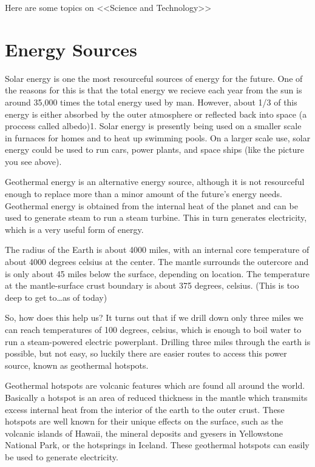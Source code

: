 \documentclass[a4paper]{article}
\begin{document}
Here are some topics on <<Science and Technology>>

\section{Energy Sources}

Solar energy is one the most resourceful sources of energy for the future. One of the reasons
for this is that the total energy we recieve each year from the sun is around 35,000 times
the total energy used by man. However, about 1/3 of this energy is either absorbed by the
outer atmosphere or reflected back into space (a proccess called albedo)1.
Solar energy is presently being used on a smaller scale in furnaces for homes and to heat up
swimming pools. On a larger scale use, solar energy could be used to run cars, power plants,
and space ships (like the picture you see above).

Geothermal energy is an alternative energy source, although it is not resourceful enough to
replace more than a minor amount of the future's energy needs. Geothermal energy is obtained
from the internal heat of the planet and can be used to generate steam to run a steam turbine.
This in turn generates electricity, which is a very useful form of energy.

The radius of the Earth is about 4000 miles, with an internal core temperature of about 4000
degrees celsius at the center. The mantle surrounds the outercore and is only about 45 miles
below the surface, depending on location. The temperature at the mantle-surface crust boundary is
about 375 degrees, celsius. (This is too deep to get to\dots as of today)

So, how does this help us? It turns out that if we drill down only three miles we can reach
temperatures of 100 degrees, celsius, which is enough to boil water to run a steam-powered electric
powerplant. Drilling three miles through the earth is possible, but not easy, so luckily there are
easier routes to access this power source, known as geothermal hotspots.

Geothermal hotspots are volcanic features which are found all around the world. Basically a hotspot
is an area of reduced thickness in the mantle which transmits excess internal heat from the interior
of the earth to the outer crust. These hotspots are well known for their unique effects on the surface,
such as the volcanic islands of Hawaii, the mineral deposits and gyesers in Yellowstone National Park,
or the hotsprings in Iceland. These geothermal hotspots can easily be used to generate electricity.
\end{document}

